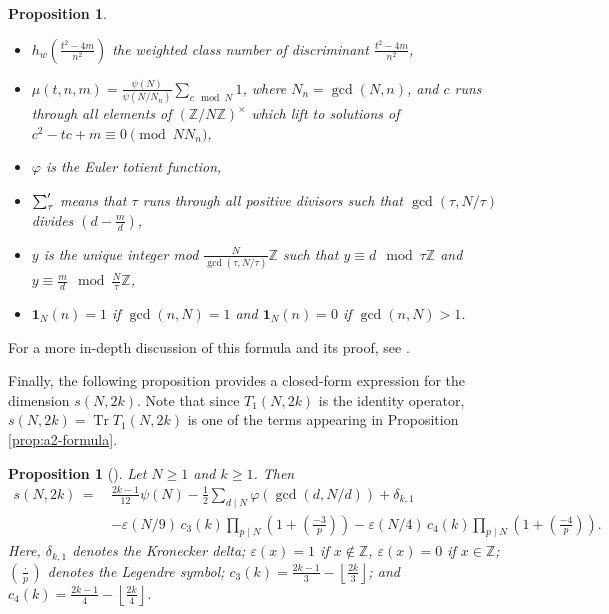 \documentclass[11pt,letterpaper,reqno]{amsart}
\numberwithin{figure}{section}
\numberwithin{table}{section}
\theoremstyle{definition}
\theoremstyle{plain}
\newcommand{\ZZ}{\mathbb{Z}}
\newcommand{\lrp}[1]{\left(#1\right)}
\newcommand{\lrfloor}[1]{\left\lfloor #1 \right\rfloor}
\newtheorem{proposition}[theorem]{Proposition}
\theoremstyle{definition}
\theoremstyle{definition}
\theoremstyle{remark}
\numberwithin{equation}{section}
\DeclareMathOperator{\Tr}{Tr}
\begin{document}
\begin{proposition}
\begin{itemize}
    \item $h_w\left(\frac{t^2-4m}{n^2}\right)$ the weighted class number of discriminant $\frac{t^2 - 4m}{n^2}$,
    \item  $\mu(t,n,m)=\frac{\psi(N)}{\psi(N/N_{n})}\sum_{c\mod N}1$, where $N_n=\gcd(N,n)$, and $c$ runs through all elements of $(\mathbb{Z}/N\mathbb{Z})^{\times}$ which lift to solutions of $c^2-tc+m\equiv0\pmod {NN_n}$,
    \item $\varphi$ is the Euler totient function,
    \item $ \sump_{\tau} $ means that $\tau$ runs through all positive divisors such that 
    $\gcd(\tau,N/\tau)$ divides $(d-\frac{m}{d})$,
    \item $y$ is the unique integer mod $\frac{N}{\gcd(\tau,N/\tau)}\mathbb{Z}$ such that $y\equiv d\mod \tau \mathbb{Z}$ and $y\equiv \frac{m}{d}\mod \frac{N}{\tau} \mathbb{Z}$,
    \item $\mathbf{1}_N(n)=1$ if $\gcd(n,N)=1$ and $\mathbf{1}_N(n)=0$ if $\gcd(n,N)>1$.
\end{itemize}
\end{proposition}
For a more in-depth discussion of this formula and its proof, see \cite{knightly2006traces}. 

Finally, the following proposition provides a closed-form expression for the dimension $s(N,2k)$. Note that since $T_1(N,2k)$ is the identity operator, $s(N,2k) = \Tr T_1(N,2k)$ is one of the terms appearing in Proposition \ref{prop:a2-formula}. 

\begin{proposition}[{\cite[Corollary 7.4.3]{cohen-stromberg}}] \label{prop:dim-formula}
    Let $N \ge 1$ and $k \ge 1$. Then
    \begin{align}
        s(N,2k) \,=\, & \frac{2k-1}{12} \psi(N) - \frac12  \sum_{d\mid N} \varphi(\gcd(d,N/d)) + \delta_{k,1} \\
        & - \varepsilon(N/9)\, c_3(k) \prod_{p \mid N} \lrp{1 + \lrp{\frac{-3}{p}} } 
        - \varepsilon(N/4)\, c_4(k) \prod_{p \mid N} \lrp{1 + \lrp{\frac{-4}{p}} }.
    \end{align}
    Here, $\delta_{k,1}$ denotes the Kronecker delta; $\varepsilon(x) = 1$ if $x \not\in \ZZ$, $\varepsilon(x) = 0$ if $x \in \ZZ$; $\lrp{\frac{\cdot}{p}}$ denotes the Legendre symbol; $c_3(k) = \frac{2k-1}{3} - \lrfloor{\frac{2k}{3}} $; and $c_4(k) = \frac{2k-1}{4} - \lrfloor{\frac{2k}{4}} $.
    
\end{proposition}
\end{document}

